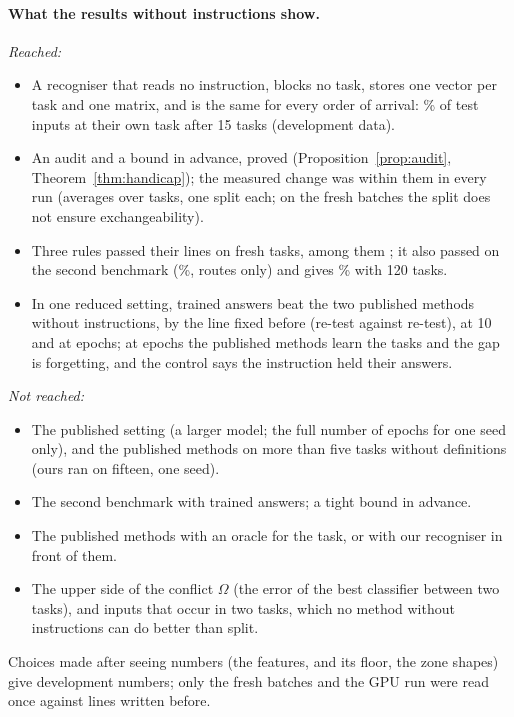 

\begin{table}[t]
  \caption{The 15 SuperNI tasks without definitions, seed 42, 10 epochs, re-test: the same plain adapters under each rule; columns as in Table~\ref{tab:noinstfull}, last column the share at the own task after the last task. The three bottom rows are the run with definitions of Section~\ref{sec:fifteen}, for reference.}
  \label{tab:noinstfifteen}
  \centering
  
\end{table}

\paragraph{What the results without instructions show.}
\emph{Reached:}
\begin{itemize}
\item A recogniser that reads no instruction, blocks no task, stores one vector per task and one matrix, and is the same for every order of arrival: \AudDevLLamOneEnd{}\% of test inputs at their own task after 15 tasks (development data).
\item An audit and a bound in advance, proved (Proposition~\ref{prop:audit}, Theorem~\ref{thm:handicap}); the measured change was within them in every run (averages over tasks, one split each; on the fresh batches the split does not ensure exchangeability).
\item Three rules passed their lines on fresh tasks, among them \recog{}; it also passed on the second benchmark (\AudScaleLongThreeEnd{}\%, routes only) and gives \AudScaleAllHundredTwentyEnd{}\% with 120 tasks.
\item In one reduced setting, trained answers beat the two published methods without instructions, by the line fixed before (re-test against re-test), at 10 and at \AudFullEpochs{} epochs; at \AudFullEpochs{} epochs the published methods learn the tasks and the gap is forgetting, and the control says the instruction held their answers.
\end{itemize}
\emph{Not reached:}
\begin{itemize}
\item The published setting (a larger model; the full number of epochs for one seed only), and the published methods on more than five tasks without definitions (ours ran on fifteen, one seed).
\item The second benchmark with trained answers; a tight bound in advance.
\item The published methods with an oracle for the task, or with our recogniser in front of them.
\item The upper side of the conflict $\Omega$ (the error of the best classifier between two tasks), and inputs that occur in two tasks, which no method without instructions can do better than split.
\end{itemize}
Choices made after seeing numbers (the features, \handicap{} and its floor, the zone shapes) give development numbers; only the fresh batches and the GPU run were read once against lines written before.
